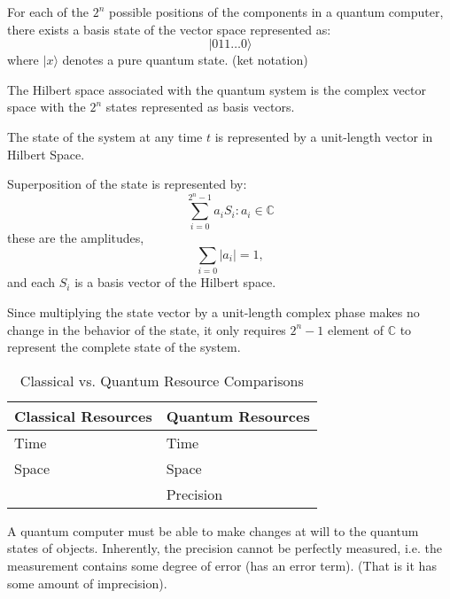 \begin{nota}
    For each of the $2^{n}$ possible positions of the components in a quantum computer, there exists a basis state of the vector space represented as:
    \[ |011 \ldots 0 \rangle \]
    where $|x \rangle$ denotes a pure quantum state.
    (ket notation)
\end{nota}


\begin{prot}
    The Hilbert space associated with the quantum system is the complex vector space with the $2^{n}$ states represented as basis vectors.
\end{prot}


\begin{prot}
    The state of the system at any time $t$ is represented by a unit-length vector in Hilbert Space.
\end{prot}


\begin{nota}
    Superposition of the state is represented by:
    \[\sum_{i=0}^{2^{n}-1} a_{i} S_{i} : a_{i} \in \mathbb{C}\]
    these are the amplitudes,
    \[\sum_{i=0} |a_{i}| = 1, \] and each $S_{i}$ is a basis vector of the Hilbert space.
\end{nota}


\begin{asu}
    Since multiplying the state vector by a unit-length complex phase makes no change in the behavior of the state, it only requires $2^{n} -1$ element of $\mathbb{C}$ to represent the complete state of the system.    
\end{asu}


\begin{table}
\begin{center}
\begin{tabularx}{250pt}{|X|X|} \hline
    Classical Resources & Quantum Resources \\ \hline
    Time & Time \\ \hline
    Space & Space \\ \hline
    & Precision \\ \hline
\end{tabularx}
\caption{Classical vs. Quantum Resource Comparisons}
\label{tbl:classvquantresource}
\end{center}
\end{table}



\begin{prot}    
    A quantum computer must be able to make changes at will to the quantum states of objects. Inherently, the precision cannot be perfectly measured, i.e. the measurement contains some degree of error (has an error term). 
    (That is it has some amount of imprecision).
\end{prot}


